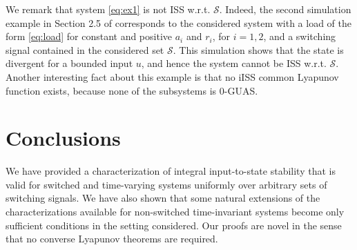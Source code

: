 \documentclass[9pt,final,journal]{IEEEtran}
\def\S{\mathcal{S}}
\def\mer{\hfill $\circ$}
\begin{document}
We remark that system \eqref{eq:ex1} is not ISS w.r.t. $\S$. Indeed, the second simulation example in Section 2.5 of \cite{denhai_auto16} corresponds to the considered system with a load of the form \eqref{eq:load} for constant and positive $a_i$ and $r_i$, for $i=1,2$, and a switching signal contained in the considered set $\S$. This simulation shows that the state is divergent for a bounded input $u$, and hence the system cannot be ISS w.r.t. $\S$. Another interesting fact about this example is that no iISS common Lyapunov function exists, because none of the subsystems is 0-GUAS.%

\section{Conclusions}
\label{sec:concl}

We have provided a characterization of integral input-to-state stability that is valid for switched and time-varying systems uniformly over arbitrary sets of switching signals. We have also shown that some natural extensions of the characterizations available for non-switched time-invariant systems become only sufficient conditions in the setting considered. Our proofs are novel in the sense that no converse Lyapunov theorems are required.  

\appendix
\end{document}

